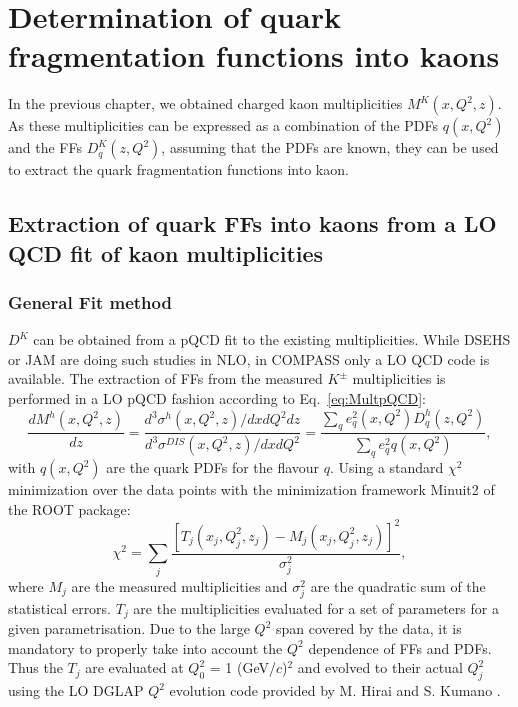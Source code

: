 
\chapter{Determination of quark fragmentation functions into kaons} %

\label{ch:FF} %


In the previous chapter, we obtained charged kaon multiplicities $M^K(x,Q^2,z)$. As these multiplicities can be expressed as a combination of the PDFs $q(x,Q^2)$ and the FFs $D^K_q(z,Q^2)$, assuming that the PDFs are known, they can be used to extract the quark fragmentation functions into kaon.



\section{Extraction of quark FFs into kaons from a LO QCD fit of kaon multiplicities}

\subsection{General Fit method}

$D^K$ can be obtained from a pQCD fit to the existing multiplicities. While DSEHS or JAM are doing such studies in NLO, in COMPASS only a LO QCD code is available. The extraction of FFs from the measured $K^{\pm}$ multiplicities is performed in a LO pQCD fashion according to Eq.~\ref{eq:MultpQCD}:
%
\begin{equation}
  \frac{dM^h(x,Q^2,z)}{dz} = \frac{d^3\sigma^h(x,Q^2,z)/dxdQ^2dz}{d^3\sigma^{DIS}(x,Q^2,z)/dxdQ^2} = \frac{\sum_q e^2_q(x,Q^2)D^h_q(z,Q^2)}{\sum_q e^2_qq(x,Q^2)},
\end{equation}
%
with $q(x,Q^2)$ are the quark PDFs for the flavour $q$. Using a standard $\chi^2$ minimization over the data points with the minimization framework Minuit2 of the ROOT package:
%
\begin{equation} \label{eq:MultpQCD}
  \chi^2 = \sum_j \frac{\left[T_j\left(x_j,Q^2_j,z_j\right) - M_j\left(x_j,Q^2_j,z_j\right)\right]^2}{\sigma^2_j},
\end{equation}
%
where $M_j$ are the measured multiplicities and $\sigma^2_j$ are the quadratic sum of the statistical errors. $T_j$ are the multiplicities evaluated for a set of parameters for a given parametrisation. Due to the large $Q^2$ span covered by the data, it is mandatory to properly take into account the $Q^2$ dependence of FFs and PDFs. Thus the $T_j$ are evaluated at $Q^2_0$ = 1 (GeV/$c$)$^2$ and evolved to their actual $Q^2_j$ using the LO DGLAP $Q^2$ evolution code provided by M. Hirai and S. Kumano \cite{HKNS}.

